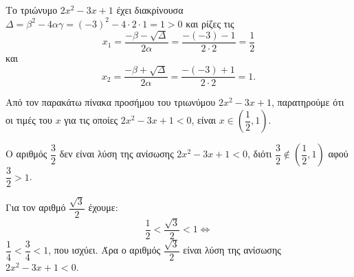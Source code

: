 
\begin{alist}
\item Το τριώνυμο $2x^2 - 3x + 1$ έχει διακρίνουσα $\Delta = \beta^2 - 4\alpha\gamma = (-3)^2 - 4 \cdot 2 \cdot 1 = 1 > 0$ και ρίζες τις
\[x_1 = \dfrac{-\beta - \sqrt{\Delta}}{2\alpha} = \dfrac{-(-3) - 1}{2 \cdot 2} = \dfrac{1}{2}\]
και
\[x_2 = \dfrac{-\beta + \sqrt{\Delta}}{2\alpha} = \dfrac{-(-3) + 1}{2 \cdot 2} = 1.\]

\item Από τον παρακάτω πίνακα προσήμου του τριωνύμου $2x^2 - 3x + 1$, παρατηρούμε ότι οι τιμές του $x$ για τις οποίες $2x^2 - 3x + 1 < 0$, είναι $x \in \left(\dfrac{1}{2}, 1\right)$.

\begin{center}
\end{center}

\item Ο αριθμός $\dfrac{3}{2}$ δεν είναι λύση της ανίσωσης $2x^2 - 3x + 1 < 0$, διότι $\dfrac{3}{2} \notin \left(\dfrac{1}{2}, 1\right)$ αφού $\dfrac{3}{2} > 1$.

Για τον αριθμό $\dfrac{\sqrt{3}}{2}$ έχουμε:
\[\dfrac{1}{2} < \dfrac{\sqrt{3}}{2} < 1 \Leftrightarrow\]
$\dfrac{1}{4} < \dfrac{3}{4} < 1$, που ισχύει.
Άρα ο αριθμός $\dfrac{\sqrt{3}}{2}$ είναι λύση της ανίσωσης $2x^2 - 3x + 1 < 0$.
\end{alist}

